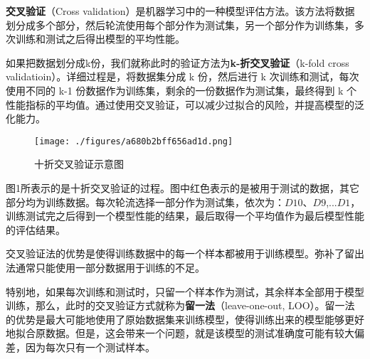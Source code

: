 


\textbf{交叉验证}（Cross validation）是机器学习中的一种模型评估方法。该方法将数据划分成多个部分，然后轮流使用每个部分作为测试集，另一个部分作为训练集，多次训练和测试之后得出模型的平均性能。

如果把数据划分成k份，我们就称此时的验证方法为\textbf{k-折交叉验证}（k-fold cross validatioin）。详细过程是，将数据集分成 k 份，然后进行 k 次训练和测试，每次使用不同的 k-1 份数据作为训练集，剩余的一份数据作为测试集，最终得到 k 个性能指标的平均值。通过使用交叉验证，可以减少过拟合的风险，并提高模型的泛化能力。

\begin{figure}[ht]
\centering
\texttt{[image: ./figures/a680b2bff656ad1d.png]}
\caption{十折交叉验证示意图} \label{fig_CroVal_1}
\end{figure}
图1所表示的是十折交叉验证的过程。图中红色表示的是被用于测试的数据，其它部分均为训练数据。每次轮流选择一部分作为测试集，依次为：$D10$、$D9$,...$D1$，训练测试完之后得到一个模型性能的结果，最后取得一个平均值作为最后模型性能的评估结果。

交叉验证法的优势是使得训练数据中的每一个样本都被用于训练模型。弥补了留出法通常只能使用一部分数据用于训练的不足。

特别地，如果每次训练和测试时，只留一个样本作为测试，其余样本全部用于模型训练，那么，此时的交叉验证方式就称为\textbf{留一法}（leave-one-out, LOO）。留一法的优势是最大可能地使用了原始数据集来训练模型，使得训练出来的模型能够更好地拟合原数据。但是，这会带来一个问题，就是该模型的测试准确度可能有较大偏差，因为每次只有一个测试样本。
